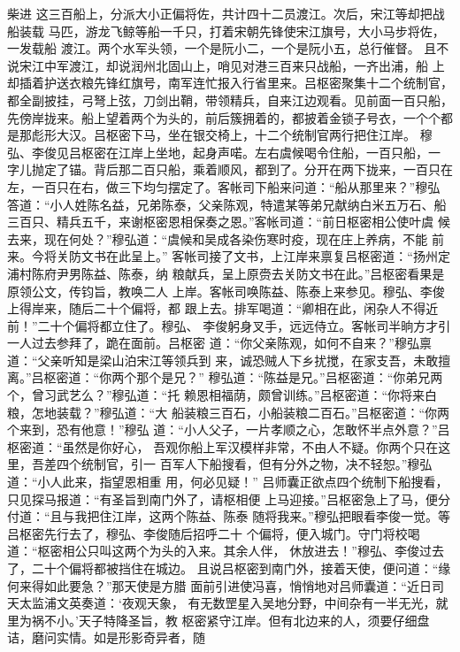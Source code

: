 柴进
这三百船上，分派大小正偏将佐，共计四十二员渡江。次后，宋江等却把战船装载
马匹，游龙飞鲸等船一千只，打着宋朝先锋使宋江旗号，大小马步将佐，一发载船
渡江。两个水军头领，一个是阮小二，一个是阮小五，总行催督。
且不说宋江中军渡江，却说润州北固山上，哨见对港三百来只战船，一齐出浦，船
上却插着护送衣粮先锋红旗号，南军连忙报入行省里来。吕枢密聚集十二个统制官，
都全副披挂，弓弩上弦，刀剑出鞘，带领精兵，自来江边观看。见前面一百只船，
先傍岸拢来。船上望着两个为头的，前后簇拥着的，都披着金锁子号衣，一个个都
是那彪形大汉。吕枢密下马，坐在银交椅上，十二个统制官两行把住江岸。
穆弘、李俊见吕枢密在江岸上坐地，起身声喏。左右虞候喝令住船，一百只船，一
字儿抛定了锚。背后那二百只船，乘着顺风，都到了。分开在两下拢来，一百只在
左，一百只在右，做三下均匀摆定了。客帐司下船来问道：“船从那里来？”穆弘
答道：“小人姓陈名益，兄弟陈泰，父亲陈观，特遣某等弟兄献纳白米五万石、船
三百只、精兵五千，来谢枢密恩相保奏之恩。”客帐司道：“前日枢密相公使叶虞
候去来，现在何处？”穆弘道：“虞候和吴成各染伤寒时疫，现在庄上养病，不能
前来。今将关防文书在此呈上。”
客帐司接了文书，上江岸来禀复吕枢密道：“扬州定浦村陈府尹男陈益、陈泰，纳
粮献兵，呈上原赍去关防文书在此。”吕枢密看果是原领公文，传钧旨，教唤二人
上岸。客帐司唤陈益、陈泰上来参见。穆弘、李俊上得岸来，随后二十个偏将，都
跟上去。排军喝道：“卿相在此，闲杂人不得近前！”二十个偏将都立住了。穆弘、
李俊躬身叉手，远远侍立。客帐司半晌方才引一人过去参拜了，跪在面前。吕枢密
道：“你父亲陈观，如何不自来？”穆弘禀道：“父亲听知是梁山泊宋江等领兵到
来，诚恐贼人下乡扰搅，在家支吾，未敢擅离。”吕枢密道：“你两个那个是兄？”
穆弘道：“陈益是兄。”吕枢密道：“你弟兄两个，曾习武艺么？”穆弘道：“托
赖恩相福荫，颇曾训练。”吕枢密道：“你将来白粮，怎地装载？”穆弘道：“大
船装粮三百石，小船装粮二百石。”吕枢密道：“你两个来到，恐有他意！”穆弘
道：“小人父子，一片孝顺之心，怎敢怀半点外意？”吕枢密道：“虽然是你好心，
吾观你船上军汉模样非常，不由人不疑。你两个只在这里，吾差四个统制官，引一
百军人下船搜看，但有分外之物，决不轻恕。”穆弘道：“小人此来，指望恩相重
用，何必见疑！”
吕师囊正欲点四个统制下船搜看，只见探马报道：“有圣旨到南门外了，请枢相便
上马迎接。”吕枢密急上了马，便分付道：“且与我把住江岸，这两个陈益、陈泰
随将我来。”穆弘把眼看李俊一觉。等吕枢密先行去了，穆弘、李俊随后招呼二十
个偏将，便入城门。守门将校喝道：“枢密相公只叫这两个为头的入来。其余人伴，
休放进去！”穆弘、李俊过去了，二十个偏将都被挡住在城边。
且说吕枢密到南门外，接着天使，便问道：“缘何来得如此要急？”那天使是方腊
面前引进使冯喜，悄悄地对吕师囊道：“近日司天太监浦文英奏道：‘夜观天象，
有无数罡星入吴地分野，中间杂有一半无光，就里为祸不小。’天子特降圣旨，教
枢密紧守江岸。但有北边来的人，须要仔细盘诘，磨问实情。如是形影奇异者，随
